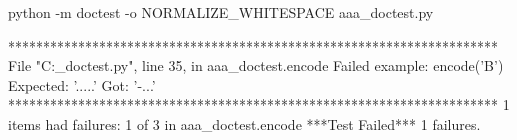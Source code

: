 python -m doctest -o NORMALIZE_WHITESPACE aaa_doctest.py

**********************************************************************
File "C:\Users{}\aaa_doctest.py", line 35, in aaa_doctest.encode
Failed example:
    encode('B')
Expected:
    '.....'
Got:
    '-...'
**********************************************************************
1 items had failures:
   1 of   3 in aaa_doctest.encode
***Test Failed*** 1 failures.